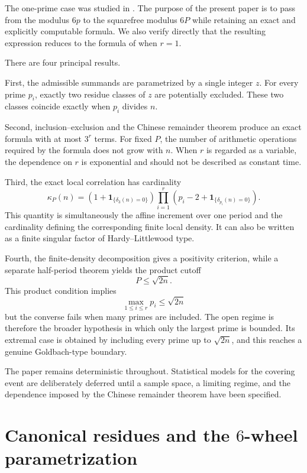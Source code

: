 \documentclass[12pt]{article}
\numberwithin{equation}{section}
\theoremstyle{definition}
\theoremstyle{remark}
\newcommand{\one}[1]{\mathbf 1_{\{#1\}}}
\begin{document}
The one-prime case was studied in \cite{Salazar2026}. The purpose
of the present paper is to pass from the modulus $6p$ to the
squarefree modulus $6P$ while retaining an exact and explicitly
computable formula. We also verify directly that the resulting
expression reduces to the formula of \cite{Salazar2026} when
$r=1$.

There are four principal results.

First, the admissible summands are parametrized by a single
integer $z$. For every prime $p_i$, exactly two residue classes
of $z$ are potentially excluded. These two classes coincide
exactly when $p_i$ divides $n$.

Second, inclusion--exclusion and the Chinese remainder theorem
produce an exact formula with at most $3^r$ terms. For fixed $P$,
the number of arithmetic operations required by the formula does
not grow with $n$. When $r$ is regarded as a variable, the
dependence on $r$ is exponential and should not be described as
constant time.

Third, the exact local correlation has cardinality
\[
\kappa_P(n)=
\left(1+\one{\delta_3(n)=0}\right)
\prod_{i=1}^{r}
\left(p_i-2+\one{\delta_{p_i}(n)=0}\right).
\]
This quantity is simultaneously the affine increment over one
period and the cardinality defining the corresponding finite
local density. It can also be written as a finite singular factor
of Hardy--Littlewood type.

Fourth, the finite-density decomposition gives a positivity
criterion, while a separate half-period theorem yields the
product cutoff
\[
P\leq\sqrt{2n}.
\]
This product condition implies
\[
\max_{1\leq i\leq r}p_i\leq\sqrt{2n}
\]
but the converse fails when many primes are included. The open
regime is therefore the broader hypothesis in which only the
largest prime is bounded. Its extremal case is obtained by
including every prime up to $\sqrt{2n}$, and this reaches a genuine
Goldbach-type boundary.

The paper remains deterministic throughout. Statistical models
for the covering event are deliberately deferred until a sample
space, a limiting regime, and the dependence imposed by the
Chinese remainder theorem have been specified.

\section{Canonical residues and the
\texorpdfstring{$6$}{6}-wheel parametrization}
\end{document}
